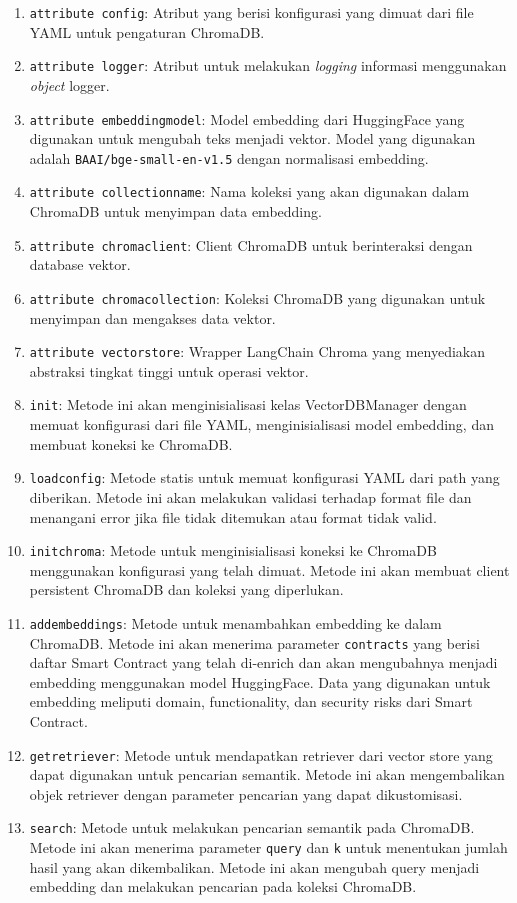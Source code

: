 \begin{enumerate}
	\item \texttt{attribute config}: Atribut yang berisi konfigurasi yang dimuat dari file YAML untuk pengaturan ChromaDB.
	\item \texttt{attribute logger}: Atribut untuk melakukan \textit{logging} informasi menggunakan \textit{object} logger.
	\item \texttt{attribute embedding\textunderscore model}: Model embedding dari HuggingFace yang digunakan untuk mengubah teks menjadi vektor. Model yang digunakan adalah \texttt{BAAI/bge-small-en-v1.5} dengan normalisasi embedding.
	\item \texttt{attribute collection\textunderscore name}: Nama koleksi yang akan digunakan dalam ChromaDB untuk menyimpan data embedding.
	\item \texttt{attribute chroma\textunderscore client}: Client ChromaDB untuk berinteraksi dengan database vektor.
	\item \texttt{attribute chroma\textunderscore collection}: Koleksi ChromaDB yang digunakan untuk menyimpan dan mengakses data vektor.
	\item \texttt{attribute vectorstore}: Wrapper LangChain Chroma yang menyediakan abstraksi tingkat tinggi untuk operasi vektor.
	\item \texttt{\textunderscore\textunderscore init\textunderscore\textunderscore}: Metode ini akan menginisialisasi kelas VectorDBManager dengan memuat konfigurasi dari file YAML, menginisialisasi model embedding, dan membuat koneksi ke ChromaDB.
	\item \texttt{load\textunderscore config}: Metode statis untuk memuat konfigurasi YAML dari path yang diberikan. Metode ini akan melakukan validasi terhadap format file dan menangani error jika file tidak ditemukan atau format tidak valid.
	\item \texttt{init\textunderscore chroma}: Metode untuk menginisialisasi koneksi ke ChromaDB menggunakan konfigurasi yang telah dimuat. Metode ini akan membuat client persistent ChromaDB dan koleksi yang diperlukan.
	\item \texttt{add\textunderscore embeddings}: Metode untuk menambahkan embedding ke dalam ChromaDB. Metode ini akan menerima parameter \texttt{contracts} yang berisi daftar Smart Contract yang telah di-enrich dan akan mengubahnya menjadi embedding menggunakan model HuggingFace. Data yang digunakan untuk embedding meliputi domain, functionality, dan security risks dari Smart Contract.
	\item \texttt{get\textunderscore retriever}: Metode untuk mendapatkan retriever dari vector store yang dapat digunakan untuk pencarian semantik. Metode ini akan mengembalikan objek retriever dengan parameter pencarian yang dapat dikustomisasi.
	\item \texttt{search}: Metode untuk melakukan pencarian semantik pada ChromaDB. Metode ini akan menerima parameter \texttt{query} dan \texttt{k} untuk menentukan jumlah hasil yang akan dikembalikan. Metode ini akan mengubah query menjadi embedding dan melakukan pencarian pada koleksi ChromaDB.
\end{enumerate}

